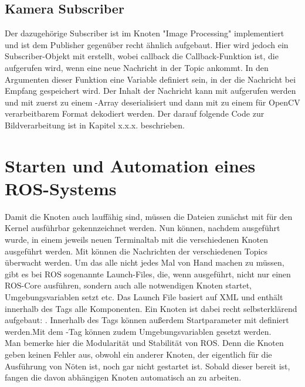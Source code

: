 \subsection{Kamera Subscriber}
Der dazugehörige Subscriber ist im Knoten "Image Processing" implementiert und ist dem Publisher gegenüber recht ähnlich aufgebaut. Hier wird jedoch ein Subscriber-Objekt mit  erstellt, wobei callback die Callback-Funktion ist, die aufgerufen wird, wenn eine neue Nachricht in der Topic ankommt. In den Argumenten dieser Funktion eine Variable  definiert sein, in der die Nachricht bei Empfang gespeichert wird. Der Inhalt der Nachricht kann mit  aufgerufen werden und mit  zuerst zu einem -Array deserialisiert und dann mit  zu einem für OpenCV verarbeitbarem Format dekodiert werden. Der darauf folgende Code zur Bildverarbeitung ist in Kapitel x.x.x. beschrieben. \cite{aniskoubaa2019}
\section{Starten und Automation eines ROS-Systems}
Damit die Knoten auch lauffähig sind, müssen die Dateien zunächst mit  für den Kernel ausführbar gekennzeichnet werden. Nun können, nachdem  ausgeführt wurde, in einem jeweils neuen Terminaltab mit  die verschiedenen Knoten ausgeführt werden. Mit  können die Nachrichten der verschiedenen Topics überwacht werden. Um das alle nicht jedes Mal von Hand machen zu müssen, gibt es bei ROS sogenannte Launch-Files, die, wenn ausgeführt, nicht nur einen ROS-Core ausführen, sondern auch alle notwendigen Knoten startet, Umgebungsvariablen setzt etc. Das Launch File basiert auf XML und enthält innerhalb des  Tags alle Komponenten. Ein Knoten ist dabei recht selbsterklärend aufgebaut: . Innerhalb des Tags können außerdem Startparameter mit  definiert werden.Mit dem -Tag können zudem Umgebungsvariablen gesetzt werden.\\

Man bemerke hier die Modularität und Stabilität von ROS. Denn die Knoten geben keinen Fehler aus, obwohl ein anderer Knoten, der eigentlich für die Ausführung von Nöten ist, noch gar nicht gestartet ist. Sobald dieser bereit ist, fangen die davon abhängigen Knoten automatisch an zu arbeiten. 

